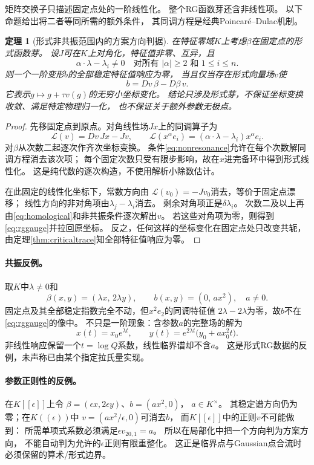 \documentclass[11pt,a4paper]{ctexart}
\theoremstyle{cnplain}\newtheorem{theorem}{定理}[section]
\theoremstyle{definition}\newtheorem{definition}[theorem]{定义}
\theoremstyle{remark}\newtheorem{remark}[theorem]{注}
\begin{document}
矩阵交换子只描述固定点处的一阶线性化。
整个RG函数芽还含非线性项。
以下命题给出将二者等同所需的额外条件，
其同调方程是经典Poincaré--Dulac机制\cite{CMVcrit}。

\begin{theorem}[形式非共振范围内的方案方向判据]\label{thm:rgresonance}
在特征零域$K$上考虑$\beta$在固定点的形式函数芽。
设$J$可在$K$上对角化，特征值非零、互异，且
\[
 \alpha\cdot\lambda-\lambda_i\ne0
 \quad\text{对所有 }|\alpha|\ge2\text{ 和 }1\le i\le n.
 \tag{CF9}\label{eq:nonresonance}
\]
则一个一阶变形$b$的全部稳定特征值响应为零，
当且仅当存在形式向量场$v$使
\[
 b=Dv\,\beta-D\beta\,v.
 \tag{CF10}\label{eq:rggauge}
\]
它表示$g\mapsto g+\tau v(g)$的无穷小坐标变化。
结论只涉及形式芽，不保证坐标变换收敛、满足特定物理归一化，
也不保证关于额外参数无极点。
\end{theorem}
\begin{proof}
先移固定点到原点。对角线性场$Jx$上的同调算子为
\[
 \mathcal L(v)=Dv\,Jx-Jv,\qquad
 \mathcal L(x^\alpha e_i)
   =(\alpha\cdot\lambda-\lambda_i)x^\alpha e_i.
 \tag{CF11}\label{eq:homological}
\]
对$\beta$从次数二起逐次作齐次坐标变换。
条件\eqref{eq:nonresonance}允许在每个次数解同调方程消去该次项；
每个固定次数只受有限步影响，故在$x$进完备环中得到形式线性化。
这是纯代数的逐次构造，不使用解析小除数估计。

在此固定的线性化坐标下，常数方向由
$\mathcal L(v_0)=-Jv_0$消去，等价于固定点漂移；
线性方向的非对角项由$\lambda_j-\lambda_i$消去。
剩余对角项正是$\delta\lambda_i$。
次数二及以上再由\eqref{eq:homological}和非共振条件逐次解出$v$。
若这些对角项为零，则得到\eqref{eq:rggauge}并拉回原坐标。
反之，任何这样的坐标变化在固定点处只改变共轭，
由定理\ref{thm:criticaltrace}知全部特征值响应为零。
\end{proof}

\paragraph{共振反例。}
取$K$中$\lambda\ne0$和
\[
 \beta(x,y)=(\lambda x,\,2\lambda y),\qquad
 b(x,y)=(0,\,a x^2),\quad a\ne0.
\]
固定点及其全部稳定指数完全不动，但$x^2e_2$的同调特征值
$2\lambda-2\lambda$为零，故$b$不在\eqref{eq:rggauge}的像中。
不只是一阶现象：含参数$a$的完整场的解为
\[
 x(t)=x_0e^{\lambda t},\qquad
 y(t)=e^{2\lambda t}\bigl(y_0+a x_0^2t\bigr).
\]
非线性响应保留一个$t=\log Q$系数，线性临界谱却不含$a$。
这是形式RG数据的反例，未声称已由某个指定拉氏量实现。

\paragraph{参数正则性的反例。}
在$K[[\epsilon]]$上令
$\beta=(\epsilon x,2\epsilon y)$、$b=(a x^2,0)$，
$a\in K^\times$。
其稳定谱方向仍为零；在$K((\epsilon))$中
$v=(a x^2/\epsilon,0)$可消去$b$，
而$K[[\epsilon]]$中的正则$v$不可能做到：
所需单项式系数必须满足$\epsilon v_{20,1}=a$。
所以在局部化中把一个方向判为方案方向，
不能自动判为允许的$\epsilon$正则有限重整化。
这正是临界点与Gaussian点合流时必须保留的算术/形式边界。
\end{document}
